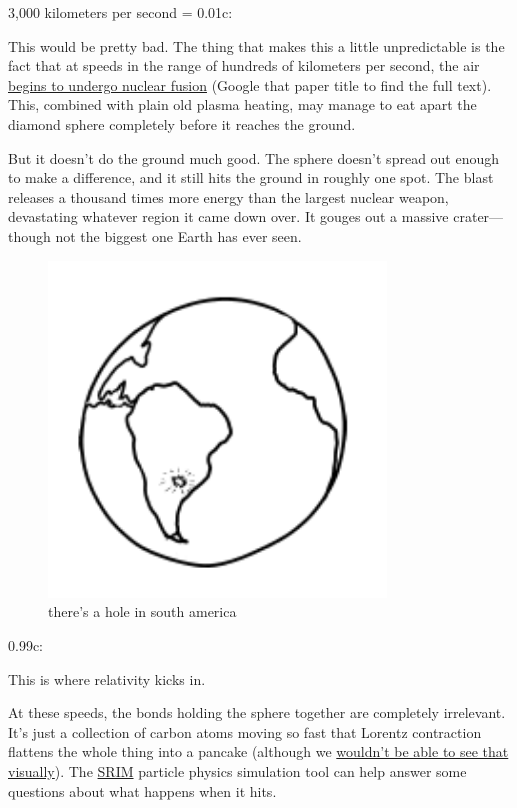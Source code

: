 {3,000 kilometers per second = 0.01c:}

{This would be pretty bad. The thing that makes this a little unpredictable is the fact that at speeds in the range of hundreds of kilometers per second, the air \href{http://www.sciencedirect.com/science/article/pii/0032063389900305}{begins to undergo nuclear fusion} (Google that paper title to find the full text). This, combined with plain old plasma heating, may manage to eat apart the diamond sphere completely before it reaches the ground.}

{But it doesn’t do the ground much good. The sphere doesn’t spread out enough to make a difference, and it still hits the ground in roughly one spot. The blast releases a thousand times more energy than the largest nuclear weapon, devastating whatever region it came down over. It gouges out a massive crater—though not the biggest one Earth has ever seen.}

\begin{figure}[!htbp]
\centering
\includegraphics[scale=0.5, max width=0.8\textwidth]{imgs/a/20/diamond_3000.png}
\caption{there's a hole in south america}
\end{figure}

{0.99c:}

{This is where relativity kicks in.}

{At these speeds, the bonds holding the sphere together are completely irrelevant. It’s just a collection of carbon atoms moving so fast that Lorentz contraction flattens the whole thing into a pancake (although we \href{http://www.math.ubc.ca/\~cass/courses/m309-01a/cook/terrell1.html}{wouldn’t be able to see that visually}). The \href{http://www.srim.org/}{SRIM} particle physics simulation tool can help answer some questions about what happens when it hits.}

